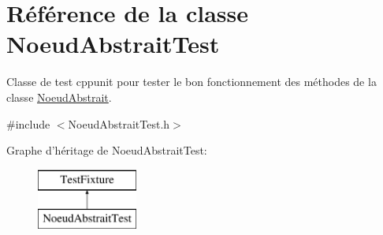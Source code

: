 \hypertarget{class_noeud_abstrait_test}{\section{Référence de la classe Noeud\-Abstrait\-Test}
\label{class_noeud_abstrait_test}
}


Classe de test cppunit pour tester le bon fonctionnement des méthodes de la classe \hyperlink{class_noeud_abstrait}{Noeud\-Abstrait}.  




{\ttfamily \#include $<$Noeud\-Abstrait\-Test.\-h$>$}

Graphe d'héritage de Noeud\-Abstrait\-Test\-:\begin{figure}[H]
\begin{center}
\leavevmode
\includegraphics[height=2.000000cm]{class_noeud_abstrait_test}
\end{center}
\end{figure}
